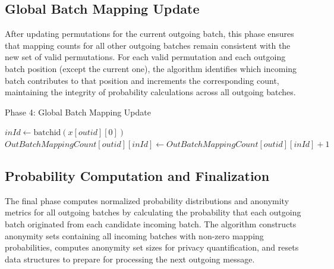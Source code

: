 \documentclass{article}
\begin{document}
\subsection{Global Batch Mapping Update}

After updating permutations for the current 
outgoing batch, this phase ensures that mapping 
counts for all other outgoing batches remain 
consistent with the new set of valid permutations. 
For each valid permutation and each outgoing 
batch position (except the current one), the 
algorithm identifies which incoming batch 
contributes to that position and increments 
the corresponding count, maintaining the 
integrity of probability calculations across 
all outgoing batches.

\begin{algorithm}[H]
\caption*{Phase 4: Global Batch Mapping Update}
\begin{algorithmic}[1]
            \State $ inId \gets \text{batchid}(x[outid][0])$
            \State $ OutBatchMappingCount[outid][inId] \gets OutBatchMappingCount[outid][inId] + 1$
        \EndIf
    \EndFor
\EndFor
\end{algorithmic}
\end{algorithm}

\subsection{Probability Computation and Finalization}

The final phase computes normalized probability 
distributions and anonymity metrics for all 
outgoing batches by calculating the probability 
that each outgoing batch originated from each 
candidate incoming batch. The algorithm constructs 
anonymity sets containing all incoming batches 
with non-zero mapping probabilities, computes 
anonymity set sizes for privacy quantification, 
and resets data structures to prepare for 
processing the next outgoing message.
\end{document}
